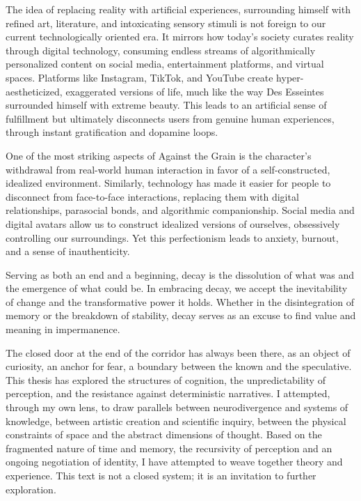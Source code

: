 The idea of replacing reality with artificial experiences, surrounding himself with refined art, literature, and intoxicating sensory stimuli is not foreign to our current technologically oriented era. It mirrors how today's society curates reality through digital technology, consuming endless streams of algorithmically personalized content on social media, entertainment platforms, and virtual spaces. Platforms like Instagram, TikTok, and YouTube create hyper-aestheticized, exaggerated versions of life, much like the way Des Esseintes surrounded himself with extreme beauty. This leads to an artificial sense of fulfillment but ultimately disconnects users from genuine human experiences, through instant gratification and dopamine loops.

One of the most striking aspects of Against the Grain is the character's withdrawal from real-world human interaction in favor of a self-constructed, idealized environment. Similarly, technology has made it easier for people to disconnect from face-to-face interactions, replacing them with digital relationships, parasocial bonds, and algorithmic companionship. Social media and digital avatars allow us to construct idealized versions of ourselves, obsessively controlling our surroundings. Yet this perfectionism leads to anxiety, burnout, and a sense of inauthenticity.

Serving as both an end and a beginning, decay is the dissolution of what was and the emergence of what could be. In embracing decay, we accept the inevitability of change and the transformative power it holds. Whether in the disintegration of memory or the breakdown of stability, decay serves as an excuse to find value and meaning in impermanence.



The closed door at the end of the corridor has always been there, as an object of curiosity, an anchor for fear, a boundary between the known and the speculative. This thesis has explored the structures of cognition, the unpredictability of perception, and the resistance against deterministic narratives. I attempted, through my own lens, to draw parallels between neurodivergence and systems of knowledge, between artistic creation and scientific inquiry, between the physical constraints of space and the abstract dimensions of thought. Based on the fragmented nature of time and memory, the recursivity of perception and an ongoing negotiation of identity, I have attempted to weave together theory and experience. This text is not a closed system; it is an invitation to further exploration. 